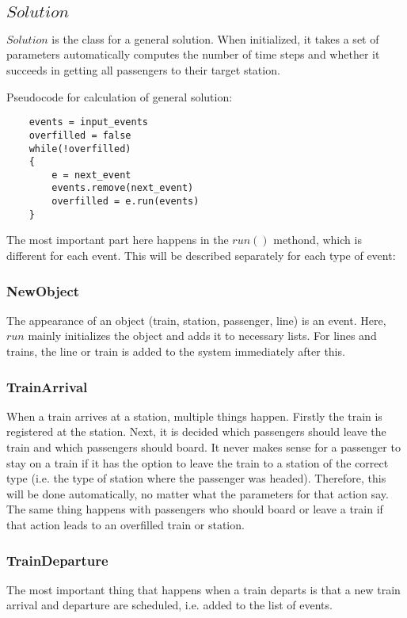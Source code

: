 \documentclass[10pt]{report}
\begin{document}
\subsection{$Solution$}
$Solution$ is the class for a general solution. When initialized, it takes a set of parameters automatically computes the number of time steps and whether it succeeds in getting all passengers to their target station.

Pseudocode for calculation of general solution: 
\lstset {language=C++}
\begin{lstlisting}
    events = input_events
    overfilled = false
    while(!overfilled)
    {   
        e = next_event
        events.remove(next_event)
        overfilled = e.run(events)
    }
\end{lstlisting}

The most important part here happens in the $run()$ methond, which is different for each event. This will be described separately for each type of event:

\subsubsection{NewObject}
The appearance of an object (train, station, passenger, line) is an event. Here, $run$ mainly initializes the object and adds it to necessary lists. For lines and trains, the line or train is added to the system immediately after this.

\subsubsection{TrainArrival}
When a train arrives at a station, multiple things happen. Firstly the train is registered at the station. Next, it is decided which passengers should leave the train and which passengers should board. It never makes sense for a passenger to stay on a train if it has the option to leave the train to a station of the correct type (i.e. the type of station where the passenger was headed). Therefore, this will be done automatically, no matter what the parameters for that action say. The same thing happens with passengers who should board or leave a train if that action leads to an overfilled train or station.

\subsubsection{TrainDeparture}
The most important thing that happens when a train departs is that a new train arrival and departure are scheduled, i.e. added to the list of events.
\end{document}
